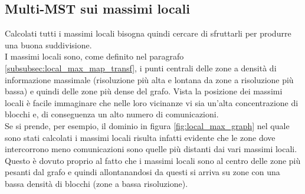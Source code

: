 {\subsection{Multi-MST sui massimi locali}
Calcolati tutti i massimi locali bisogna quindi cercare di sfruttarli per produrre una buona suddivisione.\\
I massimi locali sono, come definito nel paragrafo \ref{subsubsec:local_max_map_transf}, i punti centrali delle zone a densità di informazione massimale (risoluzione più alta e lontana da zone a risoluzione più bassa) e quindi delle zone più dense del grafo. Vista la posizione dei massimi locali è facile immaginare che nelle loro vicinanze vi sia un'alta concentrazione di blocchi e, di conseguenza un alto numero di comunicazioni.\\
Se si prende, per esempio, il dominio in figura \ref{fig:local_max_graph} nel quale sono stati calcolati i massimi locali risulta infatti evidente che le zone dove intercorrono meno comunicazioni sono quelle più distanti dai vari massimi locali.\\
Questo è dovuto proprio al fatto che i massimi locali sono al centro delle zone più pesanti dal grafo e quindi allontanandosi da questi si arriva su zone con una bassa densità di blocchi (zone a bassa risoluzione).\\

}
